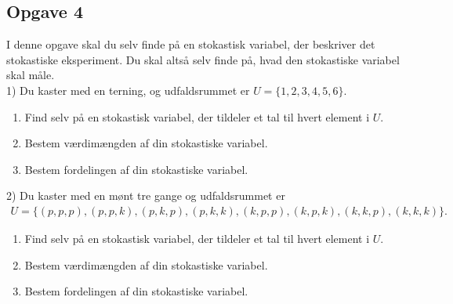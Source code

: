 \subsection*{Opgave 4}
I denne opgave skal du selv finde på en stokastisk variabel, der beskriver det stokastiske eksperiment. Du skal altså selv finde på, hvad den stokastiske variabel skal måle. \\

1) Du kaster med en terning, og udfaldsrummet er $U = \{1,2,3,4,5,6\}$. 

\begin{enumerate}[label=\roman*)]
	\item Find selv på en stokastisk variabel, der tildeler et tal til hvert element i $U$.
	\item Bestem værdimængden af din stokastiske variabel.
	\item Bestem fordelingen af din stokastiske variabel. 
\end{enumerate}

2) Du kaster med en mønt tre gange og udfaldsrummet er
\begin{align*}
	U = \{(p,p,p),(p,p,k),(p,k,p),(p,k,k),(k,p,p),(k,p,k),(k,k,p),(k,k,k)\}.
\end{align*}

\begin{enumerate}[label=\roman*)]
	\item Find selv på en stokastisk variabel, der tildeler et tal til hvert element i $U$.
	\item Bestem værdimængden af din stokastiske variabel.
	\item Bestem fordelingen af din stokastiske variabel. 
\end{enumerate}
